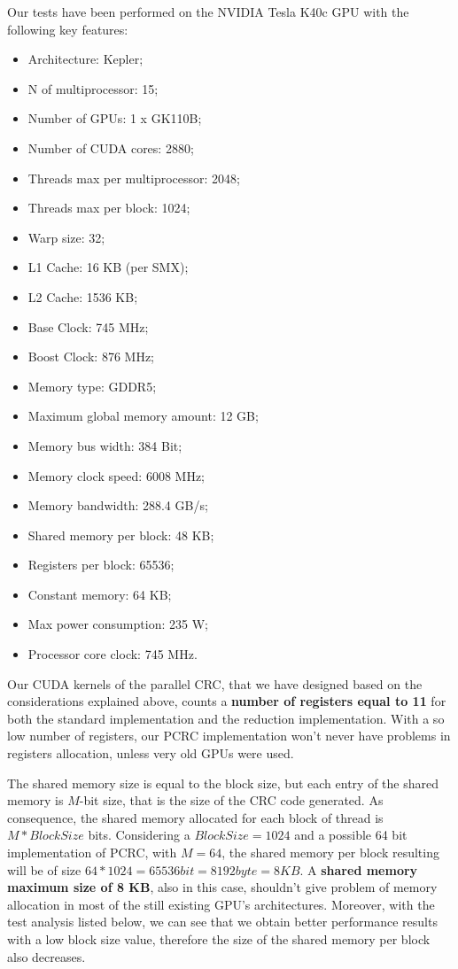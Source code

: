\documentclass[fleqn]{IEEEtran}
\begin{document}
Our tests have been performed on the NVIDIA Tesla K40c GPU with the following key
features:
\begin{itemize}
   \item Architecture: Kepler;
   \item N of multiprocessor: 15;
   \item Number of GPUs: 1 x GK110B;
   \item Number of CUDA cores: 2880;
   \item Threads max per multiprocessor: 2048;
   \item Threads max per block: 1024;
   \item Warp size: 32;
   \item L1 Cache: 16 KB (per SMX);
   \item L2 Cache: 1536 KB;
   \item Base Clock: 745 MHz;
   \item Boost Clock: 876 MHz;
   \item Memory type: GDDR5;
   \item Maximum global memory amount: 12 GB;
   \item Memory bus width: 384 Bit;
   \item Memory clock speed: 6008 MHz;
   \item Memory bandwidth: 288.4 GB/s;
   \item Shared memory per block: 48 KB;
   \item Registers per block: 65536;
   \item Constant memory: 64 KB;
   \item Max power consumption: 235 W;
   \item Processor core clock: 745 MHz.
\end{itemize}

Our CUDA kernels of the parallel CRC, that we have designed based on the considerations explained above, counts a \textbf{number of registers equal to 11} for both the standard implementation and the reduction implementation. With a so low number of registers, our PCRC implementation won't never have problems in registers allocation, unless very old GPUs were used.

The shared memory size is equal to the block size, but each entry of the shared memory is $M$-bit size, that is the size of the CRC code generated. As consequence, the shared memory allocated for each block of thread is $M * BlockSize$ bits. Considering a $BlockSize=1024$ and a possible 64 bit implementation of PCRC, with $M=64$, the shared memory per block resulting will be of size $64*1024 = 65536 bit = 8192 byte = 8 KB$. A \textbf{shared memory maximum size of 8 KB}, also in this case, shouldn't give problem of memory allocation in most of the still existing GPU's architectures. Moreover, with the test analysis listed below, we can see that we obtain better performance results with a low block size value, therefore the size of the shared memory per block also decreases.
\end{document}
